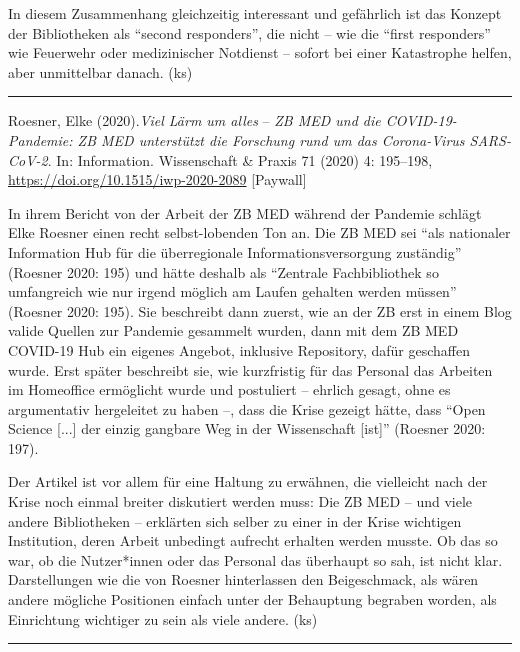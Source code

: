 \documentclass[a4paper,
fontsize=11pt,
oneside,
numbers=noperiodatend,
parskip=half-,
bibliography=totoc,
final
]{scrartcl}
\begin{document}
In diesem Zusammenhang gleichzeitig interessant und gefährlich ist das
Konzept der Bibliotheken als \enquote{second responders}, die nicht --
wie die \enquote{first responders} wie Feuerwehr oder medizinischer
Notdienst -- sofort bei einer Katastrophe helfen, aber unmittelbar
danach. (ks)

\begin{center}\rule{0.5\linewidth}{0.5pt}\end{center}

Roesner, Elke (2020).\emph{Viel Lärm um alles} -- \emph{ZB MED und die
COVID-19-Pandemie: ZB MED unterstützt die Forschung rund um das
Corona-Virus SARS-CoV-2}. In: Information. Wissenschaft \& Praxis 71
(2020) 4: 195--198, \url{https://doi.org/10.1515/iwp-2020-2089}
{[}Paywall{]}

In ihrem Bericht von der Arbeit der ZB MED während der Pandemie schlägt
Elke Roesner einen recht selbst-lobenden Ton an. Die ZB MED sei
\enquote{als nationaler Information Hub für die überregionale
Informationsversorgung zuständig} (Roesner 2020: 195) und hätte deshalb
als \enquote{Zentrale Fachbibliothek so umfangreich wie nur irgend
möglich am Laufen gehalten werden müssen} (Roesner 2020: 195). Sie
beschreibt dann zuerst, wie an der ZB erst in einem Blog valide Quellen
zur Pandemie gesammelt wurden, dann mit dem ZB MED COVID-19 Hub ein
eigenes Angebot, inklusive Repository, dafür geschaffen wurde. Erst
später beschreibt sie, wie kurzfristig für das Personal das Arbeiten im
Homeoffice ermöglicht wurde und postuliert -- ehrlich gesagt, ohne es
argumentativ hergeleitet zu haben --, dass die Krise gezeigt hätte, dass
\enquote{Open Science {[}...{]} der einzig gangbare Weg in der
Wissenschaft {[}ist{]}} (Roesner 2020: 197).

Der Artikel ist vor allem für eine Haltung zu erwähnen, die vielleicht
nach der Krise noch einmal breiter diskutiert werden muss: Die ZB MED --
und viele andere Bibliotheken -- erklärten sich selber zu einer in der
Krise wichtigen Institution, deren Arbeit unbedingt aufrecht erhalten
werden musste. Ob das so war, ob die Nutzer*innen oder das Personal das
überhaupt so sah, ist nicht klar. Darstellungen wie die von Roesner
hinterlassen den Beigeschmack, als wären andere mögliche Positionen
einfach unter der Behauptung begraben worden, als Einrichtung wichtiger
zu sein als viele andere. (ks)

\begin{center}\rule{0.5\linewidth}{0.5pt}\end{center}
\end{document}
